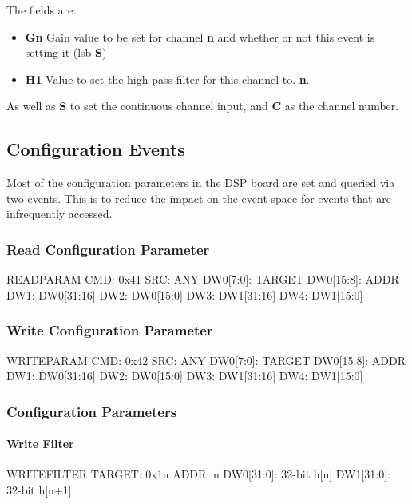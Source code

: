 The fields are:
\begin{itemize}
\item \textbf{Gn} Gain value to be set for channel \textbf{n} and whether or not this event is setting it (lsb \textbf{S})
\item \textbf{H1} Value to set the high pass filter for this channel to. \textbf{n}. 
\end{itemize}

As well as \textbf{S} to set the continuous channel input, and \textbf{C} as the channel number. 


\subsection{Configuration Events}
Most of the configuration parameters in the DSP board are set and queried via two events. This is to reduce the impact on the event space for events that are infrequently accessed. 

\subsubsection{Read Configuration Parameter}

\begin{event}{READPARAM}
CMD: 0x41
SRC: ANY
DW0[7:0]: TARGET
DW0[15:8]: ADDR
DW1: DW0[31:16]
DW2: DW0[15:0]
DW3: DW1[31:16]
DW4: DW1[15:0]
\end{event}


\subsubsection{Write Configuration Parameter}

\begin{event}{WRITEPARAM}
CMD: 0x42
SRC: ANY
DW0[7:0]: TARGET
DW0[15:8]: ADDR
DW1: DW0[31:16]
DW2: DW0[15:0]
DW3: DW1[31:16]
DW4: DW1[15:0]
\end{event}


\subsubsection{Configuration Parameters}

\paragraph{Write Filter}
\begin{dspcmd}{WRITEFILTER}
TARGET: 0x1n
ADDR: n
DW0[31:0]: 32-bit h[n]
DW1[31:0]: 32-bit h[n+1]
\end{dspcmd}


